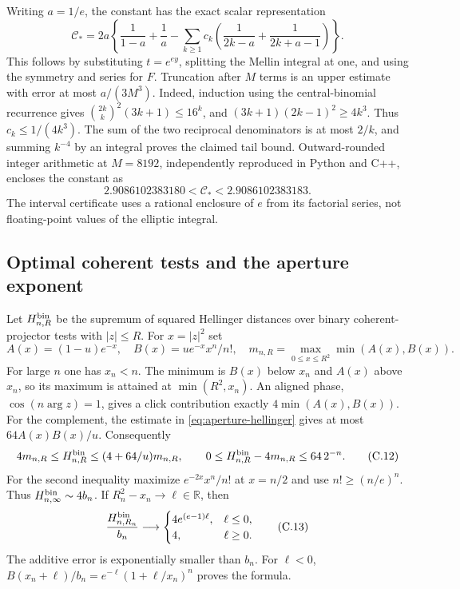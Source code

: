 \documentclass[11pt,a4paper]{article}
\numberwithin{equation}{section}
\begin{document}
Writing $a=1/e$, the constant has the exact scalar representation
\[
 \mathcal C_*=2a\left\{\frac1{1-a}+\frac1a-
 \sum_{k\ge1}c_k\left(\frac1{2k-a}+\frac1{2k+a-1}\right)\right\}.
 \tag{C.10}\label{eq:rare-constant}
\]
This follows by substituting $t=e^{ey}$, splitting the Mellin integral at
one, and using the symmetry and series for $F$.
Truncation after $M$ terms is an upper estimate with error at most
$a/(3M^3)$. Indeed, induction using the central-binomial recurrence gives
$\binom{2k}{k}^2(3k+1)\le16^k$, and
$(3k+1)(2k-1)^2\ge4k^3$. Thus $c_k\le1/(4k^3)$.
The sum of the two reciprocal denominators is at most $2/k$, and summing
$k^{-4}$ by an integral proves the claimed tail bound.
Outward-rounded integer arithmetic at $M=8192$, independently reproduced
in Python and C++, encloses the constant as
\[
 2.9086102383180<\mathcal C_*<2.9086102383183.
 \tag{C.11}\label{eq:rare-constant-enclosure}
\]
The interval certificate uses a rational enclosure of $e$ from its factorial
series, not floating-point values of the elliptic integral.

\subsection{Optimal coherent tests and the aperture exponent}
Let $H_{n,R}^{\rm bin}$ be the supremum of squared Hellinger distances over
binary coherent-projector tests with $|z|\le R$.
For $x=|z|^2$ set
\[
 A(x)=(1-u)e^{-x},\quad B(x)=ue^{-x}x^n/n!,\quad
 m_{n,R}=\max_{0\le x\le R^2}\min(A(x),B(x)).
\]
For large $n$ one has $x_n<n$. The minimum is $B(x)$ below $x_n$ and
$A(x)$ above $x_n$, so its maximum is attained at $\min(R^2,x_n)$.
An aligned phase, $\cos(n\arg z)=1$, gives a click contribution exactly
$4\min(A(x),B(x))$. For the complement, the estimate in
\eqref{eq:aperture-hellinger} gives at most $64A(x)B(x)/u$.
Consequently
\[
 4m_{n,R}\le H_{n,R}^{\rm bin}\le(4+64/u)m_{n,R},
 \qquad
 0\le H_{n,R}^{\rm bin}-4m_{n,R}\le64\,2^{-n}.
 \tag{C.12}\label{eq:rare-binary-sandwich}
\]
For the second inequality maximize $e^{-2x}x^n/n!$ at $x=n/2$ and use
$n!\ge(n/e)^n$. Thus $H_{n,\infty}^{\rm bin}\sim4b_n$.
If $R_n^2-x_n\to\ell\in\mathbb R$, then
\[
 \frac{H_{n,R_n}^{\rm bin}}{b_n}\longrightarrow
 \begin{cases}4e^{(e-1)\ell},&\ell\le0,\\4,&\ell\ge0.\end{cases}
 \tag{C.13}\label{eq:rare-binary-profile}
\]
The additive error is exponentially smaller than $b_n$. For $\ell<0$,
$B(x_n+\ell)/b_n=e^{-\ell}(1+\ell/x_n)^n$ proves the formula.
\end{document}
